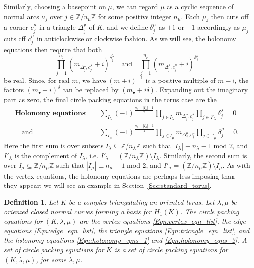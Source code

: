 \documentclass[12pt]{amsart}
\numberwithin{equation}{section}
\newtheorem{definition}[equation]{Definition}
\theoremstyle{named}
\newcommand{\refsec}[1]{Section~\ref{Sec:#1}}
\newcommand{\refeqn}[1]{\eqref{Eqn:#1}}
\newcommand{\Z}{\mathbb{Z}}
\begin{document}
Similarly, choosing a basepoint on $\mu$, we can regard $\mu$ as a cyclic sequence of normal arcs $\mu_j$ over $j \in \Z/n_\mu \Z$ for some positive integer $n_\mu$. Each $\mu_j$ then cuts off a corner $c^\mu_j$ in a triangle $\Delta^\mu_j$ of $K$, and we define $\delta^\mu_j$ as $+1$ or $-1$ accordingly as $\mu_j$ cuts off $c^\mu_j$ in anticlockwise or clockwise fashion. As we will see, the holonomy equations then require that both
\[
\prod_{j=1}^{n_\lambda} \left( m_{\Delta^\lambda_j,c^\lambda_j} + i \right)^{\delta^\lambda_j}
\quad \text{and} \quad
\prod_{j=1}^{n_\mu} \left( m_{\Delta^\mu_j,c^\mu_j} + i \right)^{\delta^\mu_j} 
\]
be real. Since, for real $m$, we have $(m+i)^{-1}$ is a positive multiple of $m-i$, the factors $(m_\bullet +i)^{\delta}$ can be replaced by $(m_\bullet + i \delta )$. Expanding out the imaginary part as zero, the final circle packing equations in the torus case are the
\begin{align}
\label{Eqn:holonomy_eqns_1}
\textbf{Holonomy equations:}& \quad
\sum_{I_\lambda} 
\left( -1 \right)^{\frac{n_\lambda - |I_\lambda| - 1}{2}}
\prod_{j \in I_\lambda} m_{\Delta^\lambda_j, c^\lambda_j} 
\prod_{j \in I'_\lambda} \delta^\lambda_j = 0 \\
\label{Eqn:holonomy_eqns_2}
\quad \text{and}& \quad
\sum_{I_\mu} 
\left( -1 \right)^{\frac{n_\mu - |I_\mu| - 1}{2}}
\prod_{j \in I_\mu} m_{\Delta^\mu_j, c^\mu_j} 
\prod_{j \in I'_\mu} \delta^\mu_j = 0.
\end{align}
Here the first sum is over subsets $I_\lambda \subseteq \Z/n_\lambda \Z$ such that $|I_\lambda| \equiv n_\lambda - 1$ mod $2$, and $I'_\lambda$ is the complement of $I_\lambda$, i.e. $I'_\lambda = (\Z/n_\lambda \Z) \setminus I_\lambda$. Similarly, the second sum is over $I_\mu \subseteq \Z/n_\mu \Z$ such that $|I_\mu| \equiv n_\mu - 1$ mod $2$, and $I'_\mu = (\Z/n_\mu \Z) \setminus I_\mu$.
As with the vertex equations, the holonomy equations are perhaps less imposing than they appear; we will see an example in \refsec{standard_torus}.

\begin{definition}
\label{Def:circle_packing_eqns_torus}
Let $K$ be a complex triangulating an oriented torus.
Let $\lambda, \mu$ be oriented closed normal curves forming a basis for $H_1 (K)$. The \emph{circle packing equations} for $(K, \lambda, \mu)$ are the vertex equations \refeqn{vertex_eqn_list}, the edge equations \refeqn{edge_eqn_list}, the triangle equations \refeqn{triangle_eqn_list}, and the holonomy equations \refeqn{holonomy_eqns_1} and \refeqn{holonomy_eqns_2}. A set of circle packing equations for $K$ is a set of circle packing equations for $(K, \lambda, \mu)$, for some $\lambda, \mu$.
\end{definition}
\end{document}
